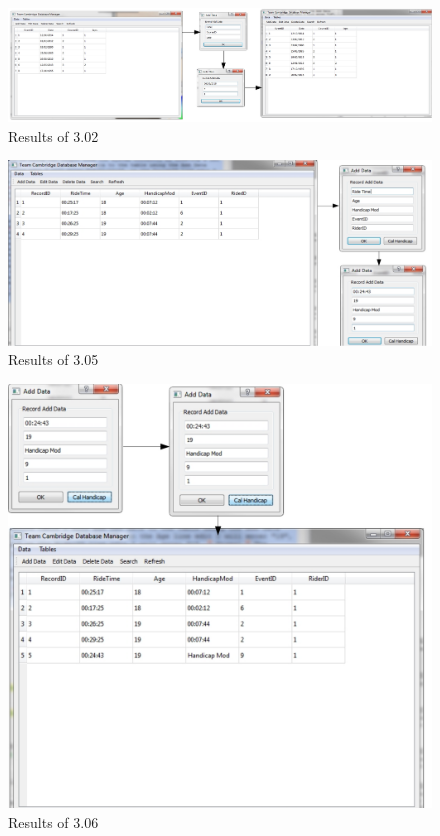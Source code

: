 \begin{landscape}
\begin{figure}[H]
    \includegraphics[width=\textwidth]{./Testing/S3/302.pdf}
    \caption{Results of 3.02} \label{fig:Results of 3.02}
\end{figure}

\begin{figure}[H]
    \includegraphics[width=\textwidth]{./Testing/S3/305.pdf}
    \caption{Results of 3.05} \label{fig:Results of 3.05}
\end{figure}

\begin{figure}[H]
    \includegraphics[width=\textwidth]{./Testing/S3/306.pdf}
    \caption{Results of 3.06} \label{fig:Results of 3.06}
\end{figure}


\end{landscape}
